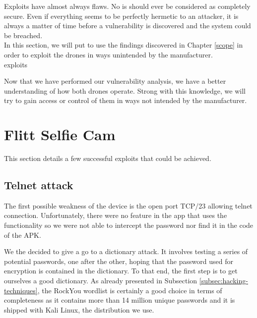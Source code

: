 \begin{chaptercover}{Exploits}%
{
{\large \hyphenation{}  have almost always flaws. No \acrshort{is} should ever be considered as completely secure. Even if everything seems to be perfectly hermetic to an attacker, it is always a matter of time before a vulnerability is discovered and the system could be breached. \newline \\ In this section, we will put to use the findings discovered in Chapter \ref{scope} in order to exploit the drones in ways unintended by the manufacturer. \newline\\}}%
{exploits}

Now that we have performed our vulnerability analysis, we have a better understanding of how both drones operate. Strong with this knowledge, we will try to gain access or control of them in ways not intended by the manufacturer.


\section{Flitt Selfie Cam}

This section details a few successful exploits that could be achieved.

\subsection{Telnet attack}

The first possible weakness of the device is the open port TCP/23 allowing telnet connection. Unfortunately, there were no feature in the app that uses the functionality so we were not able to intercept the password nor find it in the code of the APK.

We the decided to give a go to a dictionary attack. It involves testing a series of potential passwords, one after the other, hoping that the password used for encryption is contained in the dictionary. To that end, the first step is to get ourselves a good dictionary. As already presented in Subsection \ref{subsec:hacking-techniques}, the RockYou wordlist is certainly a good choice in terms of completeness as it contains more than 14 million unique passwords and it is shipped with Kali Linux, the distribution we use.


\end{chaptercover}
